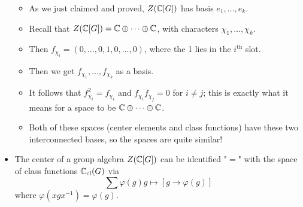 \documentclass[../notes.tex]{subfiles}
\begin{document}
\begin{itemize}
    \begin{itemize}
        \item As we just claimed and proved, $Z(\mathbb{C}[G])$ has basis $e_1,\dots,e_k$.
        \item Recall that $Z(\mathbb{C}[G])=\mathbb{C}\oplus\cdots\oplus\mathbb{C}$, with characters $\chi_1,\dots,\chi_k$.
        \item Then $f_{\chi_i}=(0,\dots,0,1,0,\dots,0)$, where the 1 lies in the $i^\text{th}$ slot.
        \item Then we get $f_{\chi_1},\dots,f_{\chi_k}$ as a basis.
        \item It follows that $f_{\chi_i}^2=f_{\chi_i}$ and $f_{\chi_i}f_{\chi_j}=0$ for $i\neq j$; this is exactly what it means for a space to be $\mathbb{C}\oplus\cdots\oplus\mathbb{C}$.
        \item Both of these spaces (center elements and class functions) have these two interconnected bases, so the spaces are quite similar!
    \end{itemize}
    \item The center of a group algebra $Z(\mathbb{C}[G])$ can be identified "$=$" with the space of class functions $\mathbb{C}_\text{cl}(G)$ via
    \begin{equation*}
        \sum\varphi(g)g \mapsto [g\to\varphi(g)]
    \end{equation*}
    where $\varphi(xgx^{-1})=\varphi(g)$.
    \begin{itemize}

\end{itemize}
\end{itemize}
\end{document}
